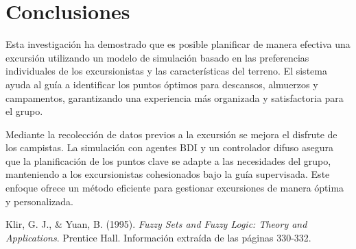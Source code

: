 \documentclass[10pt,twocolumn]{article}
\begin{document}
	
	
	\section{Conclusiones}
	Esta investigación ha demostrado que es posible planificar de manera efectiva una excursión utilizando un modelo de simulación basado en las preferencias individuales de los excursionistas y las características del terreno. El sistema ayuda al guía a identificar los puntos óptimos para descansos, almuerzos y campamentos, garantizando una experiencia más organizada y satisfactoria para el grupo. 
	
	Mediante la recolección de datos previos a la excursión se mejora el disfrute de los campistas. La simulación con agentes BDI y un controlador difuso asegura que la planificación de los puntos clave se adapte a las necesidades del grupo, manteniendo a los excursionistas cohesionados bajo la guía supervisada. Este enfoque ofrece un método eficiente para gestionar excursiones de manera óptima y personalizada.
	
	
	\begin{thebibliography}{9}
		
		 Klir, G. J., \& Yuan, B. (1995). \textit{Fuzzy Sets and Fuzzy Logic: Theory and Applications}. Prentice Hall. Información extraída de las páginas 330-332.
		
	\end{thebibliography}
	
	
\end{document}
